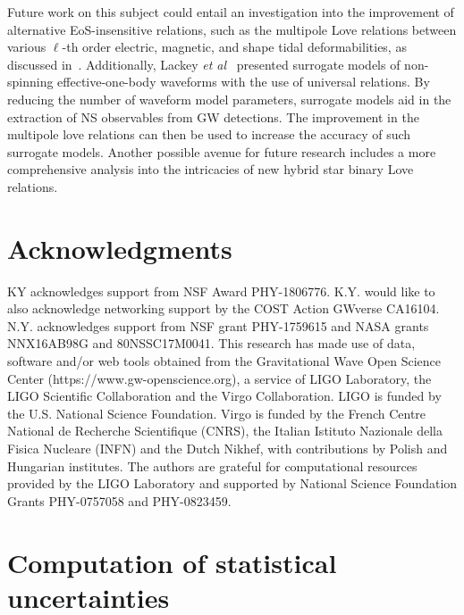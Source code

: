 \documentclass[prd,twocolumn,nofootinbib,superscriptaddress,amsmath,amssymb]{revtex4-1}
\begin{document}
Future work on this subject could entail an investigation into the improvement of alternative EoS-insensitive relations, such as the multipole Love relations between various $\ell$-th order electric, magnetic, and shape tidal deformabilities, as discussed in~\cite{Yagi:Multipole}. Additionally, Lackey \emph{et al}~\cite{Lackey:Surrogate, Lackey:EOB} presented surrogate models of non-spinning effective-one-body waveforms with the use of universal relations. By reducing the number of waveform model parameters, surrogate models aid in the extraction of NS observables from GW detections. The improvement in the multipole love relations can then be used to increase the accuracy of such surrogate models. Another possible avenue for future research includes a more comprehensive analysis into the intricacies of new hybrid star binary Love relations.


\section*{Acknowledgments}\label{acknowledgments}
KY acknowledges support from NSF Award PHY-1806776. 
K.Y. would like to also acknowledge networking support by the COST Action GWverse CA16104.
N.Y. acknowledges support from  NSF grant PHY-1759615 and NASA grants NNX16AB98G and 80NSSC17M0041.
%
This research has made use of data, software and/or web tools obtained from the Gravitational Wave Open Science Center (https://www.gw-openscience.org), a service of LIGO Laboratory, the LIGO Scientific Collaboration and the Virgo Collaboration. LIGO is funded by the U.S. National Science Foundation. Virgo is funded by the French Centre National de Recherche Scientifique (CNRS), the Italian Istituto Nazionale della Fisica Nucleare (INFN) and the Dutch Nikhef, with contributions by Polish and Hungarian institutes.
%
The authors are grateful for computational resources provided by the LIGO Laboratory and supported by National Science Foundation Grants PHY-0757058 and PHY-0823459.  


\appendix

\section{Computation of statistical uncertainties}\label{app:stackingProcedure}
\end{document}
